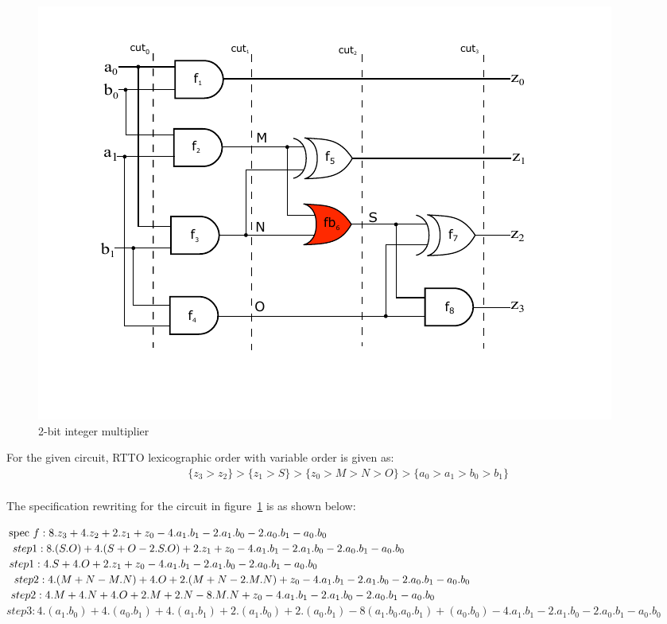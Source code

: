 \documentclass{article}
\begin{document}
\begin{figure}[ht]
	\begin{center}
	\includegraphics[scale = 0.98]{int_mul_b}
	\end{center}
	\vspace{-4ex}
	\caption{2-bit integer multiplier}
	\label{int_mul_b}
	\vspace{-2ex}
\end{figure}

For the given circuit, RTTO lexicographic order with variable order is given as:
\begin{align*}
\{z_3 > z_2\}>\{z_1> S\}>\{z_0> M> N> O\}>\{a_0> a_1> b_0> b_1\}\\
\end{align*}

The specification rewriting for the circuit in figure~\ref{int_mul_b} is as shown below:

$\text{spec }f: 8.z_3 + 4.z_2 + 2.z_1 + z_0 - 4.a_1.b_1 - 2.a_1.b_0 - 2.a_0.b_1 -a_0.b_0\\$
    $step1: 8.(S.O) + 4.(S+O-2.S.O) + 2.z_1 + z_0 - 4.a_1.b_1 - 2.a_1.b_0 - 2.a_0.b_1 -a_0.b_0\\$
    $step1: 4.S + 4.O + 2.z_1 + z_0 - 4.a_1.b_1 - 2.a_1.b_0 - 2.a_0.b_1 -a_0.b_0\\$
    $step2: 4.(M+N-M.N) + 4.O + 2.(M+N-2.M.N) + z_0 - 4.a_1.b_1 - 2.a_1.b_0 - 2.a_0.b_1 -a_0.b_0\\$
    $step2: 4.M + 4.N + 4.O + 2.M + 2.N -8.M.N + z_0 - 4.a_1.b_1 - 2.a_1.b_0 - 2.a_0.b_1 -a_0.b_0\\$
    $step3: 4.(a_1.b_0) + 4.(a_0.b_1) + 4.(a_1.b_1) + 2.(a_1.b_0) + 2.(a_0.b_1) - 8(a_1.b_0.a_0.b_1) + (a_0.b_0) - 4.a_1.b_1 - 2.a_1.b_0 - 2.a_0.b_1 -a_0.b_0$
\end{document}
